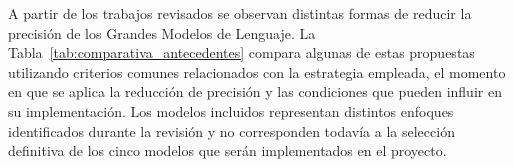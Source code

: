 
A partir de los trabajos revisados se observan distintas formas de reducir la precisión de los Grandes Modelos de Lenguaje. La Tabla~\ref{tab:comparativa_antecedentes} compara algunas de estas propuestas utilizando criterios comunes relacionados con la estrategia empleada, el momento en que se aplica la reducción de precisión y las condiciones que pueden influir en su implementación. Los modelos incluidos representan distintos enfoques identificados durante la revisión y no corresponden todavía a la selección definitiva de los cinco modelos que serán implementados en el proyecto.

